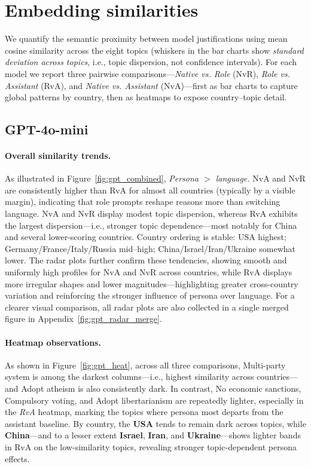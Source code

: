 \section{Embedding similarities}
We quantify the semantic proximity between model justifications using mean cosine similarity across the eight topics (whiskers in the bar charts show \emph{standard deviation across topics}, i.e., topic dispersion, not confidence intervals). For each model we report three pairwise comparisons—\emph{Native vs. Role} (NvR), \emph{Role vs. Assistant} (RvA), and \emph{Native vs. Assistant} (NvA)—first as bar charts to capture global patterns by country, then as heatmaps to expose country–topic detail.

\subsection{GPT-4o-mini}

\paragraph{Overall similarity trends.}
As illustrated in Figure~\ref{fig:gpt_combined}, \emph{Persona $>$ language.} NvA and NvR are consistently higher than RvA for almost all countries (typically by a visible margin), indicating that role prompts reshape reasons more than switching language. NvA and NvR display modest topic dispersion, whereas RvA exhibits the largest dispersion—i.e., stronger topic dependence—most notably for China and several lower-scoring countries. Country ordering is stable: USA highest; Germany/France/Italy/Russia mid–high; China/Israel/Iran/Ukraine somewhat lower.
The radar plots further confirm these tendencies, showing smooth and uniformly high profiles for NvA and NvR across countries, while RvA displays more irregular shapes and lower magnitudes—highlighting greater cross-country variation and reinforcing the stronger influence of persona over language.
For a clearer visual comparison, all radar plots are also collected in a single merged figure in Appendix~\ref{fig:gpt_radar_merge}.

\paragraph{Heatmap observations.}
As shown in Figure~\ref{fig:gpt_heat}, across all three comparisons, Multi-party system is among the darkest columns—i.e., highest similarity across countries—and Adopt atheism is also consistently dark. In contrast, No economic sanctions, Compulsory voting, and Adopt libertarianism are repeatedly lighter, especially in the \emph{RvA} heatmap, marking the topics where persona most departs from the assistant baseline. By country, the \textbf{USA} tends to remain dark across topics, while \textbf{China}—and to a lesser extent \textbf{Israel}, \textbf{Iran}, and \textbf{Ukraine}—shows lighter bands in RvA on the low-similarity topics, revealing stronger topic-dependent persona effects.


